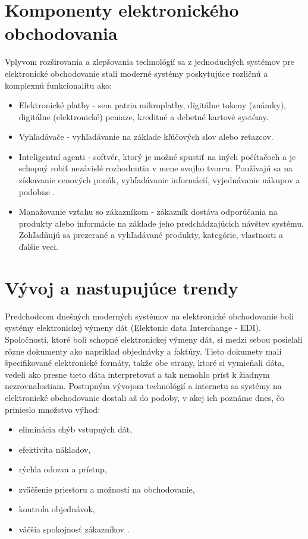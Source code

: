 \documentclass[
  printed, %
  table,   %
  lof,     %
  nolot,     %
  twoside,  
]{fithesis3}
\begin{document}
\section{Komponenty elektronického obchodovania}
Vplyvom rozširovania a zlepšovania technológií sa z jednoduchých systémov pre elektronické obchodovanie stali moderné systémy poskytujúce rozličnú a komplexnú funkcionalitu ako:
\begin{itemize}
 \item Elektronické platby - sem patria mikroplatby, digitálne tokeny (známky), digitálne (elektronické) peniaze, kreditné a debetné kartové systémy.
 \item Vyhľadávače - vyhľadávanie na základe kľúčových slov alebo reťazcov.
 \item Inteligentní agenti - softvér, ktorý je možné spustiť na iných počítačoch a je schopný robiť nezávislé rozhodnutia v mene svojho tvorcu. Používajú sa na získavanie cenových ponúk, vyhľadávanie informácií, vyjednávanie nákupov a podobne \cite{ec2}.
 \item Manažovanie vzťahu so zákazníkom - zákazník dostáva odporúčania na produkty alebo informácie na základe jeho predchádzajúcich návštev systému. Zohľadňujú sa prezerané a vyhľadávané produkty, kategórie, vlastnosti a ďalšie veci.
\end{itemize}
\section{Vývoj a nastupujúce trendy}
Predchodcom dnešných moderných systémov na elektronické obchodovanie boli systémy elektronickej výmeny dát (Elektonic data Interchange - EDI). Spoločnosti, ktoré boli schopné elektronickej výmeny dát, si medzi sebou posielali rôzne dokumenty ako napríklad objednávky a faktúry. Tieto dokumety mali špecifikované elektronické formáty, takže obe strany, ktoré si vymieňali dáta, vedeli ako presne tieto dáta interpretovať a tak nemohlo prísť k žiadnym nezrovnalostiam.
Postupným vývojom technológií a internetu sa systémy na elektronické obchodovanie dostali až do podoby, v akej ich poznáme dnes, čo prinieslo množstvo výhod:
\begin{itemize}
 \item eliminácia chýb vstupných dát,
 \item efektivita nákladov,
 \item rýchla odozva a prístup,
 \item zväčšenie priestoru a možností na obchodovanie,
 \item kontrola objednávok,
 \item väčšia spokojnosť zákazníkov \cite{ec2}.
\end{itemize}
\end{document}
